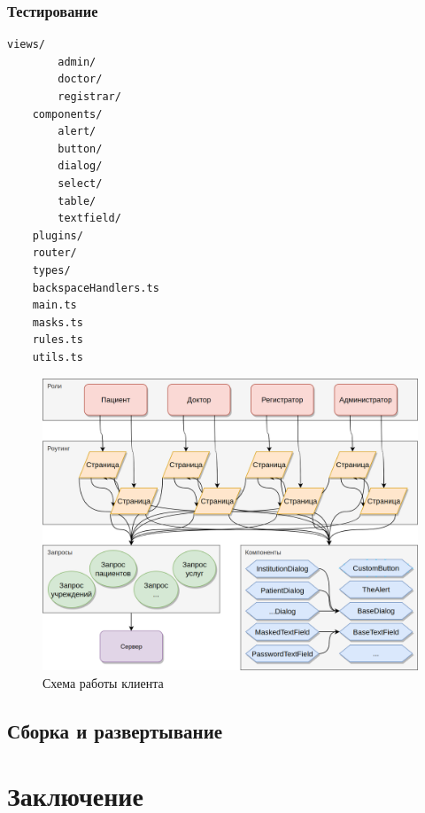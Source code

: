 \documentclass[a4paper,article]{article}
\begin{document}
    \subsubsection{Тестирование}\label{Реализация. Клиентская часть. Тестирование}

    \begin{lstlisting}[label=frontendprojectstructure,caption=Структура клиентского приложения]
    views/
        admin/
        doctor/
        registrar/
    components/
        alert/
        button/
        dialog/
        select/
        table/
        textfield/
    plugins/
    router/
    types/
    backspaceHandlers.ts
    main.ts
    masks.ts
    rules.ts
    utils.ts
    \end{lstlisting}

    \begin{figure}[h]

        \centering

        \includegraphics[width=0.9\linewidth]{Схема работы клиента.png}

        \caption{\centering Схема работы клиента}

        \label{fig:Схема работы клиента}

    \end{figure}

    \subsection{Сборка и развертывание}\label{Реализация. Сборка и развертывание}

    \newpage

    \section*{Заключение}
\end{document}
